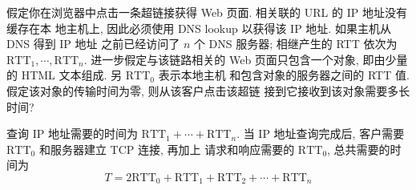 \documentclass[boxes]{homework}
\begin{document}
\begin{problem}
\label{prob:7}
假定你在浏览器中点击一条超链接获得 Web 页面. 相关联的 URL 的 IP 地址没有缓存在本
地主机上, 因此必须使用 DNS lookup 以获得该 IP 地址. 如果主机从 DNS 得到 IP 地址
之前已经访问了 $n$ 个 DNS 服务器; 相继产生的 RTT 依次为
${\mathrm{RTT}}_{1}, \cdots, {\mathrm{RTT}}_{n}$. 进一步假定与该链路相关的 Web
页面只包含一个对象, 即由少量的 HTML 文本组成. 另 $\mathrm{RTT}_{0}$ 表示本地主机
和包含对象的服务器之间的 RTT 值. 假定该对象的传输时间为零, 则从该客户点击该超链
接到它接收到该对象需要多长时间?
\end{problem}
\begin{solution}
    查询 IP 地址需要的时间为 $\mathrm{RTT}_{1} + \cdots+ \mathrm{RTT}_{n}$. 当
    IP 地址查询完成后, 客户需要 $\mathrm{RTT}_{0}$ 和服务器建立 TCP 连接, 再加上
    请求和响应需要的 $\mathrm{RTT}_{0}$, 总共需要的时间为
    \begin{equation}
        T = 2 \mathrm{RTT}_{0} + \mathrm{RTT}_{1} + \mathrm{RTT}_{2} + \cdots +
        \mathrm{RTT}_{n}
    \end{equation}
\end{solution}
\end{document}
